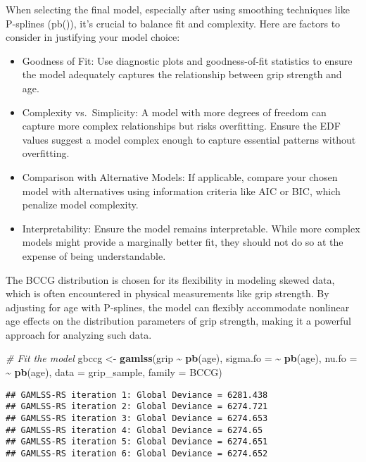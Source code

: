\documentclass[
]{article}
\newenvironment{Shaded}{\begin{snugshade}}{\end{snugshade}}
\newcommand{\AttributeTok}[1]{\textcolor[rgb]{0.13,0.29,0.53}{#1}}
\newcommand{\CommentTok}[1]{\textcolor[rgb]{0.56,0.35,0.01}{\textit{#1}}}
\newcommand{\FunctionTok}[1]{\textcolor[rgb]{0.13,0.29,0.53}{\textbf{#1}}}
\newcommand{\NormalTok}[1]{#1}
\newcommand{\OtherTok}[1]{\textcolor[rgb]{0.56,0.35,0.01}{#1}}
\newcommand{\SpecialCharTok}[1]{\textcolor[rgb]{0.81,0.36,0.00}{\textbf{#1}}}
\providecommand{\tightlist}{%
  \setlength{\itemsep}{0pt}\setlength{\parskip}{0pt}}
\begin{document}
When selecting the final model, especially after using smoothing
techniques like P-splines (pb()), it's crucial to balance fit and
complexity. Here are factors to consider in justifying your model
choice:

\begin{itemize}
\tightlist
\item
  Goodness of Fit: Use diagnostic plots and goodness-of-fit statistics
  to ensure the model adequately captures the relationship between grip
  strength and age.
\item
  Complexity vs.~Simplicity: A model with more degrees of freedom can
  capture more complex relationships but risks overfitting. Ensure the
  EDF values suggest a model complex enough to capture essential
  patterns without overfitting.
\item
  Comparison with Alternative Models: If applicable, compare your chosen
  model with alternatives using information criteria like AIC or BIC,
  which penalize model complexity.
\item
  Interpretability: Ensure the model remains interpretable. While more
  complex models might provide a marginally better fit, they should not
  do so at the expense of being understandable.
\end{itemize}

The BCCG distribution is chosen for its flexibility in modeling skewed
data, which is often encountered in physical measurements like grip
strength. By adjusting for age with P-splines, the model can flexibly
accommodate nonlinear age effects on the distribution parameters of grip
strength, making it a powerful approach for analyzing such data.

\begin{Shaded}
\begin{Highlighting}[]
\CommentTok{\# Fit the model}
\NormalTok{gbccg }\OtherTok{\textless{}{-}} \FunctionTok{gamlss}\NormalTok{(grip }\SpecialCharTok{\textasciitilde{}} \FunctionTok{pb}\NormalTok{(age),}
                \AttributeTok{sigma.fo =} \SpecialCharTok{\textasciitilde{}} \FunctionTok{pb}\NormalTok{(age),}
                \AttributeTok{nu.fo =} \SpecialCharTok{\textasciitilde{}} \FunctionTok{pb}\NormalTok{(age),}
                \AttributeTok{data =}\NormalTok{ grip\_sample,}
                \AttributeTok{family =}\NormalTok{ BCCG)}
\end{Highlighting}
\end{Shaded}

\begin{verbatim}
## GAMLSS-RS iteration 1: Global Deviance = 6281.438 
## GAMLSS-RS iteration 2: Global Deviance = 6274.721 
## GAMLSS-RS iteration 3: Global Deviance = 6274.653 
## GAMLSS-RS iteration 4: Global Deviance = 6274.65 
## GAMLSS-RS iteration 5: Global Deviance = 6274.651 
## GAMLSS-RS iteration 6: Global Deviance = 6274.652
\end{verbatim}
\end{document}

